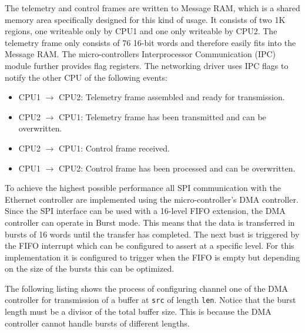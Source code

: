 The telemetry and control frames are written to Message RAM, which is a shared memory area specifically designed for this kind of usage. It consists of two 1K regions, one writeable only by CPU1 and one only writeable by CPU2. The telemetry frame only consists of 76 16-bit words and therefore easily fits into the Message RAM. The micro-controllers Interprocessor Communication (IPC) module further provides flag registers. The networking driver uses IPC flags to notify the other CPU of the following events:

\begin{itemize}
    \item CPU1 $\rightarrow$ CPU2: Telemetry frame assembled and ready for transmission.
    \item CPU2 $\rightarrow$ CPU1: Telemetry frame has been transmitted and can be overwritten.
    \item CPU2 $\rightarrow$ CPU1: Control frame received.
    \item CPU1 $\rightarrow$ CPU2: Control frame has been processed and can be overwritten.
\end{itemize}

To achieve the highest possible performance all SPI communication with the Ethernet controller are implemented using the micro-controller's DMA controller. Since the SPI interface can be used with a 16-level FIFO extension, the DMA controller can operate in Burst mode. This means that the data is transferred in bursts of 16 words until the transfer has completed. The next bust is triggered by the FIFO interrupt which can be configured to assert at a specific level. For this implementation it is configured to trigger when the FIFO is empty but depending on the size of the bursts this can be optimized.

The following listing shows the process of configuring channel one of the DMA controller for transmission of a buffer at \texttt{src} of length \texttt{len}. Notice that the burst length must be a divisor of the total buffer size. This is because the DMA controller cannot handle bursts of different lengths.

